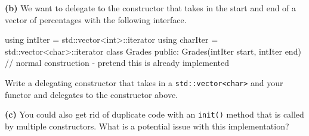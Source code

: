 \documentclass[12pt,letterpaper,twoside]{article}
\begin{document}
\begin{solution}

\end{solution}

\textbf{(b)} We want to delegate to the constructor that takes in the start and end of a vector of percentages with the following interface.
\begin{cpp}
using intIter = std::vector<int>::iterator
using charIter = std::vector<char>::iterator
class Grades
{
	public:
	Grades(intIter start, intIter end){
		// normal construction - pretend this is already implemented
	}
}
\end{cpp}

Write a delegating constructor that takes in a \texttt{std::vector<char>} and your functor and delegates to the constructor above.

\begin{solution}

\end{solution}


\textbf{(c)} You could also get rid of duplicate code with an \texttt{init()} method that is called by multiple constructors. What is a potential issue with this implementation? 

\begin{solution}

\end{solution}
\end{document}
